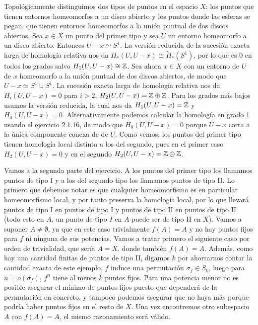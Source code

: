 \documentclass[twoside]{article}
\begin{document}
\begin{solucion}
Topológicamente distinguimos dos tipos de puntos en el espacio $X$: los puntos que tienen entornos homeomorfos a un disco abierto y los puntos donde las esferas se pegan, que tienen entornos homeomorfos a la unión puntual de dos discos abiertos. Sea $x\in X$ un punto del primer tipo y sea $U$ un entorno homeomorfo a un disco abierto. Entonces $U-x\simeq S^1$. La versión reducida de la sucesión exacta larga de homología relativa nos da $H_*(U,U-x)\cong \widetilde{H}_*(S^1)$, por lo que es 0 en todos los grados salvo $H_1(U,U-x)\cong\mathbb{Z}$. Sea ahora $x\in X$ con un entorno de $U$ de $x$ homeomorfo a la unión puntual de dos discos abiertos, de modo que $U-x\simeq S^1\sqcup S^1$. La sucesión exacta larga de homología relativa nos da $H_i(U,U-x)=0$ para $i>2$, $H_2(U,U-x)=\mathbb{Z}\oplus\mathbb{Z}$. Para los grados más bajos usamos la versión reducida, la cual nos da $H_1(U,U-x)=\mathbb{Z}$ y $H_0(U,U-x)=0$. Alternativamente podemos calcular la homología en grado 1 usando el ejercicio 2.1.16, de modo que $H_0(U,U-x)=0$ porque $U-x$ corta a la única componente conexa de de $U$. Como vemos, los puntos del primer tipo tienen homología local distinta a los del segundo, pues en el primer caso $H_2(U,U-x)=0$ y en el segundo $H_2(U,U-x)=\mathbb{Z}\oplus\mathbb{Z}$.

\vspace{0.5cm}

Vamos a la segunda parte del ejercicio. A los puntos del primer tipo los llamamos puntos de tipo I y a los del segundo tipo los llamamos puntos de tipo II. Lo primero que debemos notar es que cualquier homeomorfismo es en particular homeomorfismo local, y por tanto preserva la homología local, por lo que llevará puntos de tipo I en puntos de tipo I y puntos de tipo II en puntos de tipo II (todo esto en $A$, un punto de tipo $I$ en $A$ puede ser de tipo II en $X$). Vamos a suponer $A\neq\emptyset$, ya que en este caso trivialmente $f(A)=A$ y no hay puntos fijos para $f$ ni ninguna de sus potencias. Vamos a tratar primero el siguiente caso por orden de trivialidad, que sería $A=X$, donde también $f(A)=A$. Además, como hay una cantidad finitas de puntos de tipo II, digamos $k$ por ahorrarnos contar la cantidad exacta de este ejemplo, $f$ induce una permutación $\sigma_f\in S_k$, luego para $n=o(\sigma_f)$, $f^n$ tiene al menos $k$ puntos fijos. Para una potencia menor no es posible asegurar el mínimo de puntos fijos puesto que dependerá de la permutación en concreto, y tampoco podemos asegurar que no haya más porque podría haber puntos fijos en el resto de $X$. Una vez encontremos otro subespacio $A$ con $f(A)=A$, el mismo razonamiento será válido.


\end{solucion}
\end{document}
